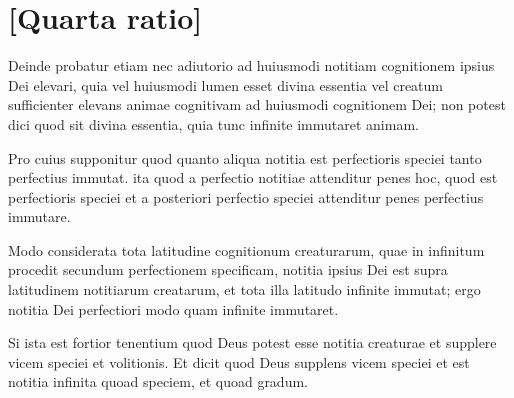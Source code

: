 \documentclass[twoside, openright]{report}
\newcommand{\name}[1]{\textsc{#1}}
\begin{document}
        \bigskip
         \section*{[Quarta ratio]} 
        \pstart
        Deinde probatur  etiam nec adiutorio  ad huiusmodi notitiam   cognitionem ipsius Dei elevari, quia vel huiusmodi lumen esset divina essentia vel  creatum sufficienter elevans  animae cognitivam ad huiusmodi cognitionem Dei; non potest dici quod sit divina essentia, quia tunc infinite immutaret animam.
        \pend
     
        \pstart
        Pro cuius  supponitur quod quanto aliqua notitia est perfectioris speciei tanto perfectius immutat.  ita quod a  perfectio notitiae attenditur penes hoc, quod est perfectioris speciei et a posteriori perfectio speciei attenditur penes  perfectius immutare.
        \pend
     
        \pstart
        Modo considerata tota latitudine cognitionum creaturarum, quae in infinitum procedit  secundum perfectionem specificam, notitia ipsius Dei est supra  latitudinem notitiarum creatarum,  et  tota illa latitudo infinite immutat; ergo notitia Dei perfectiori modo quam infinite immutaret.
        \pend
     
        \pstart
        Si  ista est  fortior  tenentium quod Deus  potest esse notitia creaturae et supplere vicem speciei et volitionis. Et \edtext{\name{Magister Ioannes de Ripa}\index[persons]{}}{\Afootnote{Ripa, XXX}} dicit quod Deus supplens vicem speciei et  est notitia infinita quoad speciem, et  quoad gradum.
        \pend
     
\end{document}
